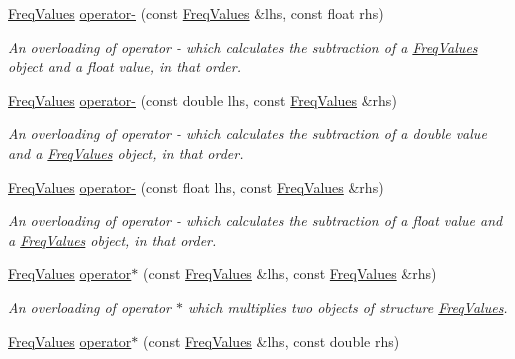 \begin{DoxyCompactItemize}
\hyperlink{structFreqValues}{Freq\+Values} \hyperlink{structFreqValues_ade558a5146a3dbea46f85e64d959ff3d}{operator-\/} (const \hyperlink{structFreqValues}{Freq\+Values} \&lhs, const float rhs)
\begin{DoxyCompactList}\small\item\em An overloading of operator -\/ which calculates the subtraction of a {\itshape \hyperlink{structFreqValues}{Freq\+Values}} object and a {\itshape float} value, in that order. \end{DoxyCompactList}\item 
\hyperlink{structFreqValues}{Freq\+Values} \hyperlink{structFreqValues_a1a94fe29740b86be6a1c148554f3b254}{operator-\/} (const double lhs, const \hyperlink{structFreqValues}{Freq\+Values} \&rhs)
\begin{DoxyCompactList}\small\item\em An overloading of operator -\/ which calculates the subtraction of a {\itshape double} value and a {\itshape \hyperlink{structFreqValues}{Freq\+Values}} object, in that order. \end{DoxyCompactList}\item 
\mbox{\label{structFreqValues_aa248d5bc83ba0c614137b042947064a8}} 
\hyperlink{structFreqValues}{Freq\+Values} \hyperlink{structFreqValues_aa248d5bc83ba0c614137b042947064a8}{operator-\/} (const float lhs, const \hyperlink{structFreqValues}{Freq\+Values} \&rhs)
\begin{DoxyCompactList}\small\item\em An overloading of operator -\/ which calculates the subtraction of a {\itshape float} value and a {\itshape \hyperlink{structFreqValues}{Freq\+Values}} object, in that order. \end{DoxyCompactList}\item 
\hyperlink{structFreqValues}{Freq\+Values} \hyperlink{structFreqValues_a3e567844a5d4347e3b30e696132bfb7c}{operator$\ast$} (const \hyperlink{structFreqValues}{Freq\+Values} \&lhs, const \hyperlink{structFreqValues}{Freq\+Values} \&rhs)
\begin{DoxyCompactList}\small\item\em An overloading of operator $\ast$ which multiplies two objects of structure {\itshape \hyperlink{structFreqValues}{Freq\+Values}}. \end{DoxyCompactList}\item 
\hyperlink{structFreqValues}{Freq\+Values} \hyperlink{structFreqValues_a59745e45a1a440ca1240667127ff01bd}{operator$\ast$} (const \hyperlink{structFreqValues}{Freq\+Values} \&lhs, const double rhs)

\end{DoxyCompactItemize}
